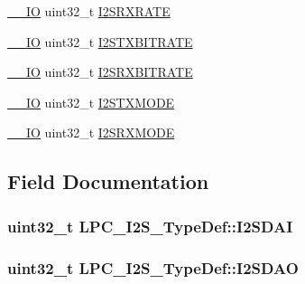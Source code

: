 \begin{DoxyCompactItemize}
\item 
\hyperlink{LPC17xx_8h_aec43007d9998a0a0e01faede4133d6be}{\+\_\+\+\_\+\+IO} uint32\+\_\+t \hyperlink{structLPC__I2S__TypeDef_a2663a5e8f2e79524ecd78e6b9cca25f3}{I2\+S\+R\+X\+R\+A\+TE}
\item 
\hyperlink{LPC17xx_8h_aec43007d9998a0a0e01faede4133d6be}{\+\_\+\+\_\+\+IO} uint32\+\_\+t \hyperlink{structLPC__I2S__TypeDef_a8e85831e05c576f7f4611e45c38dad75}{I2\+S\+T\+X\+B\+I\+T\+R\+A\+TE}
\item 
\hyperlink{LPC17xx_8h_aec43007d9998a0a0e01faede4133d6be}{\+\_\+\+\_\+\+IO} uint32\+\_\+t \hyperlink{structLPC__I2S__TypeDef_a6cdfab594ba840c805cf48ad47e23bae}{I2\+S\+R\+X\+B\+I\+T\+R\+A\+TE}
\item 
\hyperlink{LPC17xx_8h_aec43007d9998a0a0e01faede4133d6be}{\+\_\+\+\_\+\+IO} uint32\+\_\+t \hyperlink{structLPC__I2S__TypeDef_a61f677e1ab7fe967b8a491abaf272c2e}{I2\+S\+T\+X\+M\+O\+DE}
\item 
\hyperlink{LPC17xx_8h_aec43007d9998a0a0e01faede4133d6be}{\+\_\+\+\_\+\+IO} uint32\+\_\+t \hyperlink{structLPC__I2S__TypeDef_a824d505ffb143516ddedf21243a9efaa}{I2\+S\+R\+X\+M\+O\+DE}
\end{DoxyCompactItemize}


\subsection{Field Documentation}
\subsubsection[{\texorpdfstring{I2\+S\+D\+AI}{I2SDAI}}]{ uint32\+\_\+t L\+P\+C\+\_\+\+I2\+S\+\_\+\+Type\+Def\+::\+I2\+S\+D\+AI}\hypertarget{structLPC__I2S__TypeDef_a9f541e2ce6e843fc6d162c627561f88f}{}\label{structLPC__I2S__TypeDef_a9f541e2ce6e843fc6d162c627561f88f}
\subsubsection[{\texorpdfstring{I2\+S\+D\+AO}{I2SDAO}}]{ uint32\+\_\+t L\+P\+C\+\_\+\+I2\+S\+\_\+\+Type\+Def\+::\+I2\+S\+D\+AO}\hypertarget{structLPC__I2S__TypeDef_ae4208fc514ea78b5f7941017c1f67959}{}\label{structLPC__I2S__TypeDef_ae4208fc514ea78b5f7941017c1f67959}
